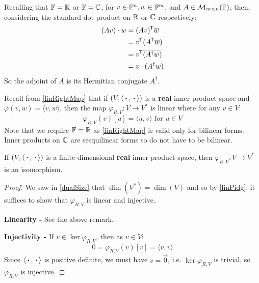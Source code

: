 \documentclass[../main.tex]{subfiles}
\begin{document}
\begin{example}
  Recalling that $\mathbb{F} = \mathbb{R}$ or $\mathbb{F} = \mathbb{C}$, for $v \in \mathbb{F}^{n}, w \in \mathbb{F}^{m}$, and $A \in \mathcal{M}_{m \times n}(\mathbb{F})$, then, considering the standard dot product on $\mathbb{R}$ or $\mathbb{C}$ respectively:
  \begin{align*}
    (Av) \cdot w &= (Av)^{{\mkern-1.5mu\mathsf{T}}} \overline{w} \\
                 &= v^{{\mkern-1.5mu\mathsf{T}}} (A^{{\mkern-1.5mu\mathsf{T}}} \overline{w}) \\
                 &= v^{{\mkern-1.5mu\mathsf{T}}} \overline{(A^{\dag} w)} \\
                 &= v \cdot (A^{\dag} w)
  \end{align*}
  So the adjoint of $A$ is its Hermitian conjugate $A^{\dag}$.
\end{example}
\begin{remark}[Recap]
  Recall from \cref{linRightMap} that if $(V, \langle {\hspace{0.18em}\boldsymbol{\cdot}\hspace{0.18em}}, {\hspace{0.18em}\boldsymbol{\cdot}\hspace{0.18em}} \rangle)$ is a \textbf{real} inner product space and $\varphi(v, w) = \langle v, w \rangle$, then the map $\varphi_{R, V}: V \to V^{*}$ is linear where for any $v \in V$:
  \[
    \varphi_{R, V}(v)[u] = \langle u, v \rangle \text{ for } u \in V
  \]
  Note that we require $\mathbb{F} = \mathbb{R}$ as \cref{linRightMap} is valid only for bilinear forms.
  Inner products on $\mathbb{C}$ are sesquilinear forms so do not have to be bilinear.
\end{remark}
\begin{theorem}
  If $(V, \langle {\hspace{0.18em}\boldsymbol{\cdot}\hspace{0.18em}}, {\hspace{0.18em}\boldsymbol{\cdot}\hspace{0.18em}} \rangle)$ is a finite dimensional \textbf{real} inner product space, then $\varphi_{R, V}: V \to V^{*}$ is an isomorphism.
\end{theorem}
\begin{proof}
  We saw in \cref{dualSize} that $\dim(V^{*}) = \dim(V)$ and so by \cref{linPidg}, it suffices to show that $\varphi_{R, V}$ is linear and injective.

  \textbf{Linearity -} See the above remark.

  \textbf{Injectivity -} If $v \in \ker \varphi_{R,V}$, then as $v \in V$:
  \[
    0 = \varphi_{R, V}(v)[v] = \langle v, v \rangle
  \]
  Since $\langle {\hspace{0.18em}\boldsymbol{\cdot}\hspace{0.18em}}, {\hspace{0.18em}\boldsymbol{\cdot}\hspace{0.18em}} \rangle$ is positive definite, we must have $v = \vec{0}$, i.e. $\ker \varphi_{R, V}$ is trivial, so $\varphi_{R, V}$ is injective.
\end{proof}
\end{document}
